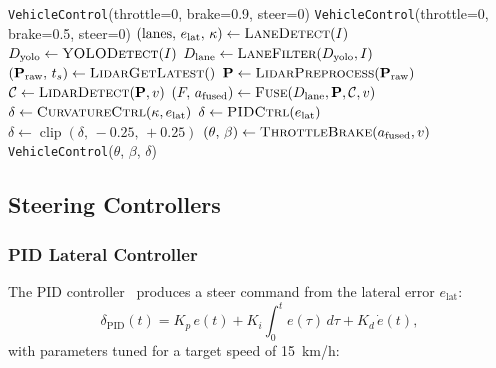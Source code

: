 \documentclass[12pt,a4paper]{article}
\begin{document}
\begin{algorithm}[H]
\caption{\texttt{DrivingAgent.process\_frame()} Main Loop}
\label{alg:process_frame}
\begin{algorithmic}[1]
  \Return \texttt{VehicleControl}(throttle=0, brake=0.9, steer=0)
  \Return \texttt{VehicleControl}(throttle=0, brake=0.5, steer=0)
\EndIf
\State $(\text{lanes},\, e_\text{lat},\, \kappa) \leftarrow
       \textsc{LaneDetect}(I)$
\State $D_\text{yolo} \leftarrow \textsc{YOLODetect}(I)$
\State $D_\text{lane} \leftarrow \textsc{LaneFilter}(D_\text{yolo}, I)$
\State $(\mathbf{P}_\text{raw},\, t_s) \leftarrow
       \textsc{LidarGetLatest}()$
\State $\mathbf{P} \leftarrow \textsc{LidarPreprocess}(\mathbf{P}_\text{raw})$
\State $\mathcal{C} \leftarrow \textsc{LidarDetect}(\mathbf{P}, v)$
\State $(F,\, a_\text{fused}) \leftarrow
       \textsc{Fuse}(D_\text{lane}, \mathbf{P}, \mathcal{C}, v)$
  \State $\delta \leftarrow \textsc{CurvatureCtrl}(\kappa, e_\text{lat})$
\Else
  \State $\delta \leftarrow \textsc{PIDCtrl}(e_\text{lat})$
\EndIf
\State $\delta \leftarrow \operatorname{clip}(\delta,\,-0.25,\,+0.25)$
\State $(\theta,\, \beta) \leftarrow
       \textsc{ThrottleBrake}(a_\text{fused}, v)$
\State \Return \texttt{VehicleControl}($\theta$, $\beta$, $\delta$)
\end{algorithmic}
\end{algorithm}

\subsection{Steering Controllers}
\label{subsec:steering}

\subsubsection{PID Lateral Controller}

The PID controller~\cite{astrom1995pid} produces a steer command from the
lateral error $e_\text{lat}$:
\begin{equation}
  \delta_\text{PID}(t) = K_p\,e(t) + K_i\!\int_0^t\!e(\tau)\,d\tau
                       + K_d\,\dot{e}(t),
  \label{eq:pid}
\end{equation}
with parameters tuned for a target speed of \SI{15}{km/h}:
\end{document}
